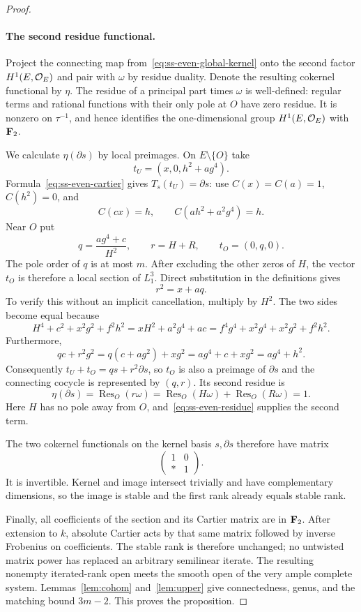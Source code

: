 \begin{proof}
\paragraph{The second residue functional.}
Project the connecting map from~\eqref{eq:ss-even-global-kernel} onto the second factor $H^1(E,\mathcal O_E)$ and pair with $\omega$ by residue duality. Denote the resulting cokernel functional by $\eta$. The residue of a principal part times $\omega$ is well-defined: regular terms and rational functions with their only pole at $O$ have zero residue. It is nonzero on $\tau^{-1}$, and hence identifies the one-dimensional group $H^1(E,\mathcal O_E)$ with $\mathbf F_2$.

We calculate $\eta(\partial s)$ by local preimages. On $E\setminus\{O\}$ take
\[
                  t_U=(x,0,h^2+ag^4).
\]
Formula~\eqref{eq:ss-even-cartier} gives $T_s(t_U)=\partial s$: use $C(x)=C(a)=1$, $C(h^2)=0$, and
\[
 C(cx)=h,\qquad
 C(ah^2+a^2g^4)=h.
\]
Near $O$ put
\[
 q=\frac{ag^4+c}{H^2},\qquad r=H+R,\qquad t_O=(0,q,0).
\]
The pole order of $q$ is at most $m$. After excluding the other zeros of $H$, the vector $t_O$ is therefore a local section of $L_1^3$. Direct substitution in the definitions gives
\begin{equation}\label{eq:ss-even-square}
                              r^2=x+aq.
\end{equation}
To verify this without an implicit cancellation, multiply by $H^2$. The two sides become equal because
\[
 H^4+c^2+x^2g^2+f^2h^2
   =xH^2+a^2g^4+ac
   =f^4g^4+x^2g^4+x^2g^2+f^2h^2.
\]
Furthermore,
\[
 qc+r^2g^2=q(c+ag^2)+xg^2
           =ag^4+c+xg^2=ag^4+h^2.
\]
Consequently $t_U+t_O=qs+r^2\partial s$, so $t_O$ is also a preimage of $\partial s$ and the connecting cocycle is represented by $(q,r)$. Its second residue is
\[
 \eta(\partial s)=\operatorname{Res}_O(r\omega)
 =\operatorname{Res}_O(H\omega)+\operatorname{Res}_O(R\omega)=1.
\]
Here $H$ has no pole away from $O$, and~\eqref{eq:ss-even-residue} supplies the second term.

The two cokernel functionals on the kernel basis $s,\partial s$ therefore have matrix
\[
                         \begin{pmatrix}1&0\\ *&1\end{pmatrix}.
\]
It is invertible. Kernel and image intersect trivially and have complementary dimensions, so the image is stable and the first rank already equals stable rank.

Finally, all coefficients of the section and its Cartier matrix are in $\mathbf F_2$. After extension to $k$, absolute Cartier acts by that same matrix followed by inverse Frobenius on coefficients. The stable rank is therefore unchanged; no untwisted matrix power has replaced an arbitrary semilinear iterate. The resulting nonempty iterated-rank open meets the smooth open of the very ample complete system. Lemmas~\ref{lem:cohom} and~\ref{lem:upper} give connectedness, genus, and the matching bound $3m-2$. This proves the proposition.
\end{proof}
